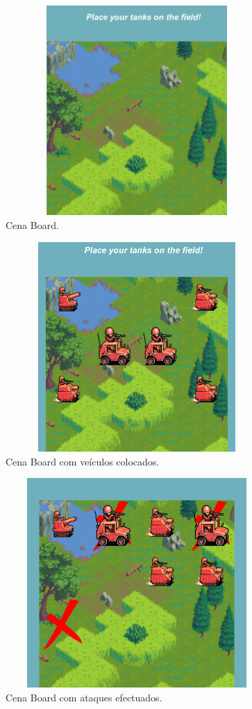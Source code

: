\begin{figure}[!h]
    \includegraphics[width=10cm, height=8cm]{screen6.png}
    \centering
    \caption{Cena Board.}
    \label{fig:screen5}
\end{figure}
    
\begin{figure}[!h]
    \includegraphics[width=10cm, height=8cm]{screen5.png}
    \centering
    \caption{Cena Board com veículos colocados.}
    \label{fig:screen6}
\end{figure}

\begin{figure}[!h]
    \includegraphics[width=10cm, height=8cm]{screen7.png}
    \centering
    \caption{Cena Board com ataques efectuados.}
    \label{fig:screen7}
\end{figure}

